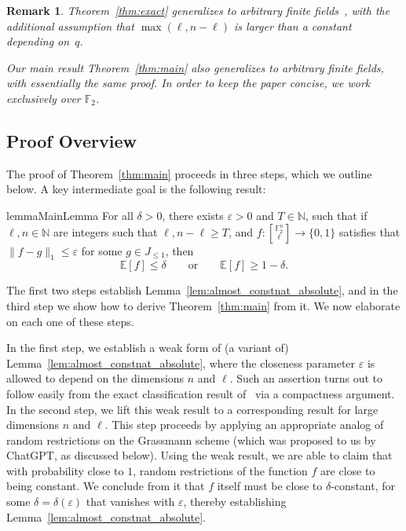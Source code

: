 \documentclass[11pt]{article}
\newtheorem{remark}[thm]{Remark}
\newcommand\E{\mathbb{E}}
\newcommand\norm[1]{\| #1 \|}
\newcommand\eps{\varepsilon}
\renewcommand\geq{\geqslant}
\renewcommand\leq{\leqslant}
\providecommand{\sqbinom}[2]{\genfrac{[}{]}{0pt}{}{#1}{#2}}
\begin{document}
\begin{remark}
Theorem~\ref{thm:exact} generalizes to arbitrary finite fields~\cite{Ihringer2023Classification,Filmus2026Grassmann}, with the additional assumption that $\max(\ell,n-\ell)$ is larger than a constant depending on~$q$.

Our main result Theorem~\ref{thm:main} also generalizes to arbitrary finite fields, with essentially the same proof. In order to keep the paper concise, we work exclusively over $\mathbb{F}_2$.
\end{remark}

\subsection{Proof Overview}
The proof of Theorem~\ref{thm:main} proceeds in three steps, which we outline below. A key intermediate goal is the following result:
\begin{restatable}{lemma}{MainLemma}
\label{lem:almost_constnat_absolute}
    For all $\delta>0$, there exists $\eps>0$ and $T\in\mathbb{N}$, such that if $\ell,n\in\mathbb{N}$ are integers such that $\ell,n-\ell\geq T$, and $f\colon {\sqbinom{\mathbb{F}_2^n}{\ell}}\to\{0,1\}$ satisfies that $\norm{f-g}_1\leq \eps$ for some $g\in J_{\leq 1}$, then
    \[
    \E[f]\leq \delta\qquad\text{or}\qquad \E[f]\geq 1-\delta.
    \]
\end{restatable}
The first two steps establish Lemma~\ref{lem:almost_constnat_absolute}, and in the third step we show how to derive Theorem~\ref{thm:main} from it. We now elaborate on each one of these steps.

In the first step, we establish a weak form of (a variant of) Lemma~\ref{lem:almost_constnat_absolute}, where the closeness parameter $\eps$  is allowed to depend on the dimensions $n$ and $\ell$. Such an assertion turns out to follow easily from the exact classification result of~\cite{FilmusIhringer} via  a compactness argument. 
In the second step, we lift this weak result to a corresponding result for large dimensions $n$ and $\ell$. This step proceeds by applying an appropriate analog of random restrictions on the Grassmann scheme (which was proposed to us by ChatGPT, as discussed below). Using the weak result, we are able to claim that with  probability close to $1$, random restrictions of the function $f$  are close to being constant. We conclude from it that $f$ itself must be close to $\delta$-constant, for some $\delta = \delta(\eps)$ that vanishes with $\eps$, thereby establishing Lemma~\ref{lem:almost_constnat_absolute}.
\end{document}
